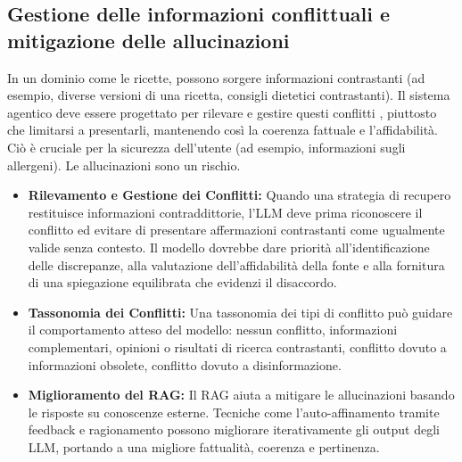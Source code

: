 \documentclass[a4paper, 11pt]{article}
\begin{document}
\subsection{Gestione delle informazioni conflittuali e mitigazione delle allucinazioni}
In un dominio come le ricette, possono sorgere informazioni contrastanti (ad esempio, diverse versioni di una ricetta, consigli dietetici contrastanti). Il sistema agentico deve essere progettato per rilevare e gestire questi conflitti \cite{dragged_into_conflicts}, piuttosto che limitarsi a presentarli, mantenendo così la coerenza fattuale e l'affidabilità. Ciò è cruciale per la sicurezza dell'utente (ad esempio, informazioni sugli allergeni). Le allucinazioni sono un rischio. \cite{mastering_rag_reranking}
\begin{itemize}
    \item \textbf{Rilevamento e Gestione dei Conflitti:} Quando una strategia di recupero restituisce informazioni contraddittorie, l'LLM deve prima riconoscere il conflitto ed evitare di presentare affermazioni contrastanti come ugualmente valide senza contesto. \cite{milvus_contradictory_info} Il modello dovrebbe dare priorità all'identificazione delle discrepanze, alla valutazione dell'affidabilità della fonte e alla fornitura di una spiegazione equilibrata che evidenzi il disaccordo. \cite{milvus_contradictory_info}
    \item \textbf{Tassonomia dei Conflitti:} Una tassonomia dei tipi di conflitto può guidare il comportamento atteso del modello: nessun conflitto, informazioni complementari, opinioni o risultati di ricerca contrastanti, conflitto dovuto a informazioni obsolete, conflitto dovuto a disinformazione. \cite{dragged_into_conflicts}
    \item \textbf{Miglioramento del RAG:} Il RAG aiuta a mitigare le allucinazioni basando le risposte su conoscenze esterne. \cite{beyond_traditional_finetuning} Tecniche come l'auto-affinamento tramite feedback e ragionamento possono migliorare iterativamente gli output degli LLM, portando a una migliore fattualità, coerenza e pertinenza. \cite{beyond_traditional_finetuning}
\end{itemize}
\end{document}
